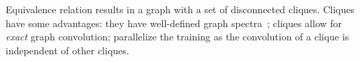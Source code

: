 Equivalence relation results in a graph with a set of disconnected cliques. %
Cliques have some advantages: they have well-defined graph spectra~\cite[p. 6]{Chung1997}; cliques allow for \textit{exact} graph convolution; parallelize the training as the convolution of a clique is independent of other cliques.












